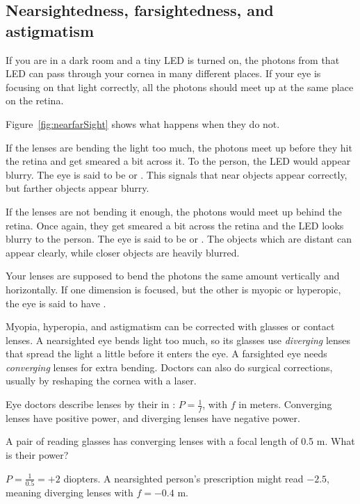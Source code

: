 \subsection{Nearsightedness, farsightedness, and astigmatism}
If you are in a dark room and a tiny LED is turned on, the photons
from that LED can pass through your cornea in many different places.
If your eye is focusing on that light correctly, all the photons
should meet up at the same place on the retina.

Figure~\ref{fig:nearfarSight} shows what happens when they do not.

If the lenses are bending the light too much, the photons meet up before they hit the
retina and get smeared a bit across it. To the person, the LED
would appear blurry. The eye is said to be  or
. This signals that near objects appear correctly, but farther objects appear blurry. 

If the lenses are not bending it enough, the photons would meet up
behind the retina. Once again, they get smeared a bit across the
retina and the LED looks blurry to the person. The eye is said to be
 or . The objects which are distant can appear clearly, while closer objects are heavily blurred. 

Your lenses are supposed to bend the photons the same amount
vertically and horizontally. If one dimension is focused, but the
other is myopic or hyperopic, the eye is said to have .

Myopia, hyperopia, and astigmatism can be corrected with glasses or contact
lenses. A nearsighted eye bends light too much, so its glasses use
\emph{diverging} lenses that spread the light a little before it enters
the eye. A farsighted eye needs \emph{converging} lenses for extra
bending. Doctors can also do surgical corrections, usually by reshaping
the cornea with a laser.

Eye doctors describe lenses by their  in
: $P = \frac{1}{f}$, with $f$ in meters. Converging
lenses have positive power, and diverging lenses have negative power.

\begin{Worked}
\begin{Problem}
A pair of reading glasses has converging lenses
with a focal length of 0.5 m. What is their power?
\end{Problem}
\begin{Solution}
$P = \frac{1}{0.5} = +2$ diopters. A nearsighted person's
prescription might read $-2.5$, meaning diverging lenses with
$f = -0.4$ m.
\end{Solution}
\end{Worked}


